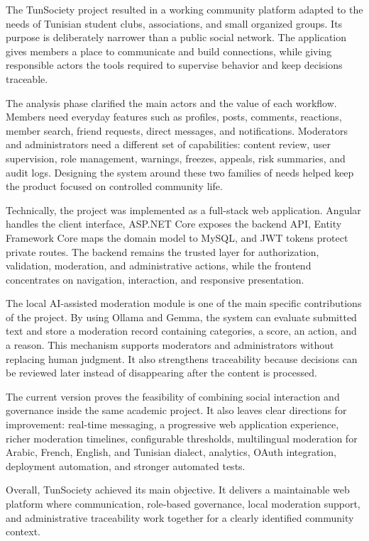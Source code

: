 The TunSociety project resulted in a working community platform adapted to the needs of Tunisian student clubs, associations, and small organized groups. Its purpose is deliberately narrower than a public social network. The application gives members a place to communicate and build connections, while giving responsible actors the tools required to supervise behavior and keep decisions traceable.

The analysis phase clarified the main actors and the value of each workflow. Members need everyday features such as profiles, posts, comments, reactions, member search, friend requests, direct messages, and notifications. Moderators and administrators need a different set of capabilities: content review, user supervision, role management, warnings, freezes, appeals, risk summaries, and audit logs. Designing the system around these two families of needs helped keep the product focused on controlled community life.

Technically, the project was implemented as a full-stack web application. Angular handles the client interface, ASP.NET Core exposes the backend API, Entity Framework Core maps the domain model to MySQL, and JWT tokens protect private routes. The backend remains the trusted layer for authorization, validation, moderation, and administrative actions, while the frontend concentrates on navigation, interaction, and responsive presentation.

The local AI-assisted moderation module is one of the main specific contributions of the project. By using Ollama and Gemma, the system can evaluate submitted text and store a moderation record containing categories, a score, an action, and a reason. This mechanism supports moderators and administrators without replacing human judgment. It also strengthens traceability because decisions can be reviewed later instead of disappearing after the content is processed.

The current version proves the feasibility of combining social interaction and governance inside the same academic project. It also leaves clear directions for improvement: real-time messaging, a progressive web application experience, richer moderation timelines, configurable thresholds, multilingual moderation for Arabic, French, English, and Tunisian dialect, analytics, OAuth integration, deployment automation, and stronger automated tests.

Overall, TunSociety achieved its main objective. It delivers a maintainable web platform where communication, role-based governance, local moderation support, and administrative traceability work together for a clearly identified community context.

